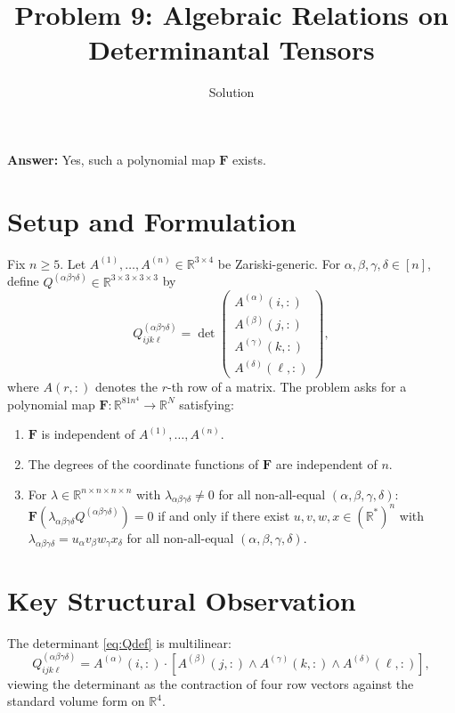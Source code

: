 \documentclass[12pt]{article}
\title{Problem 9: Algebraic Relations on Determinantal Tensors}
\author{Solution}
\date{}
\theoremstyle{definition}
\newcommand{\R}{\mathbb{R}}
\begin{document}
\maketitle

\textbf{Answer:} Yes, such a polynomial map $\mathbf{F}$ exists.

\section{Setup and Formulation}

Fix $n \geq 5$. Let $A^{(1)}, \ldots, A^{(n)} \in \R^{3 \times 4}$ be Zariski-generic. For $\alpha,\beta,\gamma,\delta \in [n]$, define $Q^{(\alpha\beta\gamma\delta)} \in \R^{3\times 3\times 3\times 3}$ by
\begin{equation}\label{eq:Qdef}
Q^{(\alpha\beta\gamma\delta)}_{ijk\ell} = \det\!\begin{pmatrix} A^{(\alpha)}(i,:) \\ A^{(\beta)}(j,:) \\ A^{(\gamma)}(k,:) \\ A^{(\delta)}(\ell,:) \end{pmatrix},
\end{equation}
where $A(r,:)$ denotes the $r$-th row of a matrix. The problem asks for a polynomial map $\mathbf{F}: \R^{81n^4} \to \R^N$ satisfying:
\begin{enumerate}
\item[(P1)] $\mathbf{F}$ is independent of $A^{(1)},\ldots,A^{(n)}$.
\item[(P2)] The degrees of the coordinate functions of $\mathbf{F}$ are independent of $n$.
\item[(P3)] For $\lambda \in \R^{n\times n\times n\times n}$ with $\lambda_{\alpha\beta\gamma\delta} \neq 0$ for all non-all-equal $(\alpha,\beta,\gamma,\delta)$: $\mathbf{F}(\lambda_{\alpha\beta\gamma\delta}Q^{(\alpha\beta\gamma\delta)}) = 0$ if and only if there exist $u,v,w,x \in (\R^*)^n$ with $\lambda_{\alpha\beta\gamma\delta} = u_\alpha v_\beta w_\gamma x_\delta$ for all non-all-equal $(\alpha,\beta,\gamma,\delta)$.
\end{enumerate}

\section{Key Structural Observation}

The determinant \eqref{eq:Qdef} is multilinear:
\begin{equation}\label{eq:multilinear}
Q^{(\alpha\beta\gamma\delta)}_{ijk\ell} = A^{(\alpha)}(i,:) \cdot [A^{(\beta)}(j,:) \wedge A^{(\gamma)}(k,:) \wedge A^{(\delta)}(\ell,:)],
\end{equation}
viewing the determinant as the contraction of four row vectors against the standard volume form on $\R^4$.
\end{document}
